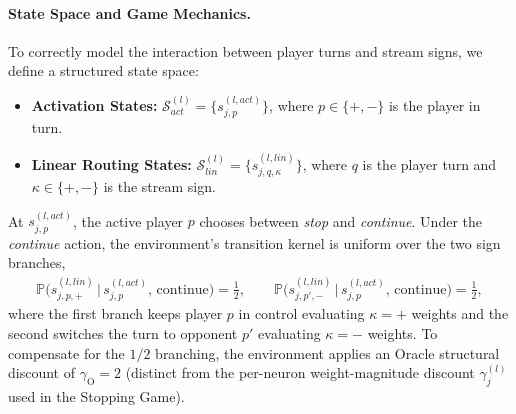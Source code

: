 \documentclass[twoside]{article}
\renewcommand{\P}{\mathbb{P}}
\newcommand{\1}{\mathbf{1}}
\begin{document}
\paragraph{State Space and Game Mechanics.}
To correctly model the interaction between player turns and stream signs, we define a structured
state space:
\begin{itemize}
    \item \textbf{Activation States:} $\mathcal{S}_{act}^{(l)} = \{ s_{j,p}^{(l, act)} \}$, where $p \in
            \{+,-\}$ is the player in turn.
    \item \textbf{Linear Routing States:} $\mathcal{S}_{lin}^{(l)} = \{ s_{j,q,\kappa}^{(l, lin)} \}$, where
        $q$ is the player turn and $\kappa \in \{+,-\}$ is the stream sign.
\end{itemize}
At $s_{j,p}^{(l, act)}$, the active player $p$ chooses between \emph{stop} and \emph{continue}.
Under the \emph{continue} action, the environment's transition kernel is uniform over the two sign
branches,
\begin{align}
    \P\bigl(s_{j,p,+}^{(l, lin)} \,\big|\, s_{j,p}^{(l, act)},\, \mathrm{continue}\bigr) =
    \tfrac{1}{2},
    \qquad
    \P\bigl(s_{j,p',-}^{(l, lin)} \,\big|\, s_{j,p}^{(l, act)},\, \mathrm{continue}\bigr) =
    \tfrac{1}{2},
\end{align}
where the first branch keeps player $p$ in control evaluating $\kappa=+$ weights and the second
switches the turn to opponent $p'$ evaluating $\kappa=-$ weights. To compensate for the $1/2$
branching, the environment applies an Oracle structural discount of $\gamma_{\mathrm{O}} = 2$
(distinct from the per-neuron weight-magnitude discount $\gamma_j^{(l)}$ used in the Stopping
Game).
\end{document}
